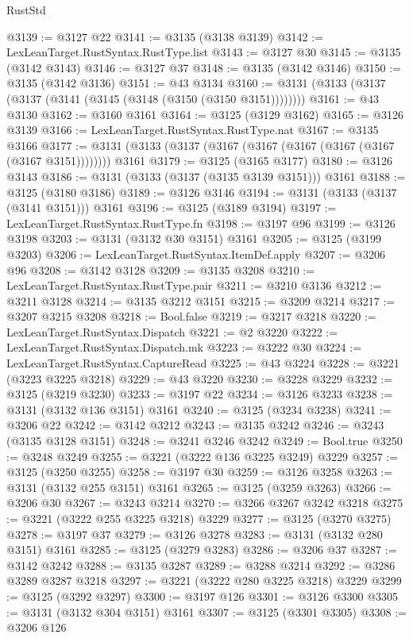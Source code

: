 \begin{lexlean}{RustStd}
\begin{coremodule}
@3139 := @3127 @22
@3141 := @3135 (@3138 @3139)
@3142 := LexLeanTarget.RustSyntax.RustType.list
@3143 := @3127 @30
@3145 := @3135 (@3142 @3143)
@3146 := @3127 @37
@3148 := @3135 (@3142 @3146)
@3150 := @3135 (@3142 @3136)
@3151 := @43 @3134
@3160 := @3131 (@3133 (@3137 (@3137 (@3141 (@3145 (@3148 (@3150 (@3150 @3151))))))))
@3161 := @43 @3130
@3162 := @3160 @3161
@3164 := @3125 (@3129 @3162)
@3165 := @3126 @3139
@3166 := LexLeanTarget.RustSyntax.RustType.nat
@3167 := @3135 @3166
@3177 := @3131 (@3133 (@3137 (@3167 (@3167 (@3167 (@3167 (@3167 (@3167 @3151)))))))) @3161
@3179 := @3125 (@3165 @3177)
@3180 := @3126 @3143
@3186 := @3131 (@3133 (@3137 (@3135 @3139 @3151))) @3161
@3188 := @3125 (@3180 @3186)
@3189 := @3126 @3146
@3194 := @3131 (@3133 (@3137 (@3141 @3151))) @3161
@3196 := @3125 (@3189 @3194)
@3197 := LexLeanTarget.RustSyntax.RustType.fn
@3198 := @3197 @96
@3199 := @3126 @3198
@3203 := @3131 (@3132 @30 @3151) @3161
@3205 := @3125 (@3199 @3203)
@3206 := LexLeanTarget.RustSyntax.ItemDef.apply
@3207 := @3206 @96
@3208 := @3142 @3128
@3209 := @3135 @3208
@3210 := LexLeanTarget.RustSyntax.RustType.pair
@3211 := @3210 @3136
@3212 := @3211 @3128
@3214 := @3135 @3212 @3151
@3215 := @3209 @3214
@3217 := @3207 @3215 @3208
@3218 := Bool.false
@3219 := @3217 @3218
@3220 := LexLeanTarget.RustSyntax.Dispatch
@3221 := @2 @3220
@3222 := LexLeanTarget.RustSyntax.Dispatch.mk
@3223 := @3222 @30
@3224 := LexLeanTarget.RustSyntax.CaptureRead
@3225 := @43 @3224
@3228 := @3221 (@3223 @3225 @3218)
@3229 := @43 @3220
@3230 := @3228 @3229
@3232 := @3125 (@3219 @3230)
@3233 := @3197 @22
@3234 := @3126 @3233
@3238 := @3131 (@3132 @136 @3151) @3161
@3240 := @3125 (@3234 @3238)
@3241 := @3206 @22
@3242 := @3142 @3212
@3243 := @3135 @3242
@3246 := @3243 (@3135 @3128 @3151)
@3248 := @3241 @3246 @3242
@3249 := Bool.true
@3250 := @3248 @3249
@3255 := @3221 (@3222 @136 @3225 @3249) @3229
@3257 := @3125 (@3250 @3255)
@3258 := @3197 @30
@3259 := @3126 @3258
@3263 := @3131 (@3132 @255 @3151) @3161
@3265 := @3125 (@3259 @3263)
@3266 := @3206 @30
@3267 := @3243 @3214
@3270 := @3266 @3267 @3242 @3218
@3275 := @3221 (@3222 @255 @3225 @3218) @3229
@3277 := @3125 (@3270 @3275)
@3278 := @3197 @37
@3279 := @3126 @3278
@3283 := @3131 (@3132 @280 @3151) @3161
@3285 := @3125 (@3279 @3283)
@3286 := @3206 @37
@3287 := @3142 @3242
@3288 := @3135 @3287
@3289 := @3288 @3214
@3292 := @3286 @3289 @3287 @3218
@3297 := @3221 (@3222 @280 @3225 @3218) @3229
@3299 := @3125 (@3292 @3297)
@3300 := @3197 @126
@3301 := @3126 @3300
@3305 := @3131 (@3132 @304 @3151) @3161
@3307 := @3125 (@3301 @3305)
@3308 := @3206 @126

\end{coremodule}
\end{lexlean}
